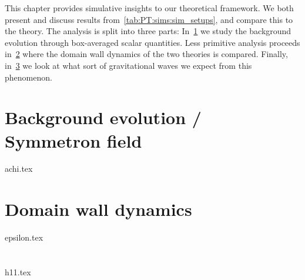


\newcommand{\lbl}[1]{\textsf{\textbf{#1}}}
\newcommand{\completelbl}[4]{%
\textbf{#1)}%
\textbf{#2:}%
\lbl{#3.#4}%
}
\newcommand{\lcoord}{\ALIASlcoord}








This chapter provides simulative insights to our theoretical framework. We both present and discuss results from~\cref{tab:PT:sims:sim_setups}, and compare this to the theory. The analysis is split into three parts: In~\cref{sec:results:achi} we study the background evolution through box-averaged scalar quantities. Less primitive analysis proceeds in~\cref{sec:results:epsilon} where the domain wall dynamics of the two theories is compared. Finally, in~\cref{sec:results:h11} we look at what sort of gravitational waves we expect from this phenomenon. 

















\section{Background evolution / Symmetron field}\label{sec:results:achi}
    {{achi.tex}}


\section{Domain wall dynamics}\label{sec:results:epsilon}
    {{epsilon.tex}}

\section{}\label{sec:results:h11}
    {{h11.tex}}



